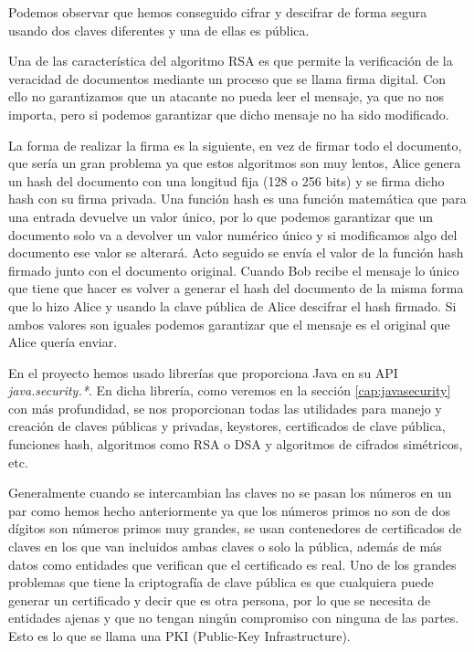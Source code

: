 Podemos observar que hemos conseguido cifrar y descifrar de forma segura usando dos claves diferentes y una de ellas es pública.

Una de las característica del algoritmo RSA es que permite la verificación de la veracidad de documentos mediante un proceso que se llama firma digital. Con ello no garantizamos que un atacante no pueda leer el mensaje, ya que no nos importa, pero si podemos garantizar que dicho mensaje no ha sido modificado. 

La forma de realizar la firma es la siguiente, en vez de firmar todo el documento, que sería un gran problema ya que estos algoritmos son muy lentos, Alice genera un hash del documento con una longitud fija (128 o 256 bits) y se firma dicho hash con su firma privada. Una función hash es una función matemática que para una entrada devuelve un valor único, por lo que podemos garantizar que un documento solo va a devolver un valor numérico único y si modificamos algo del documento ese valor se alterará. Acto seguido se envía el valor de la función hash firmado junto con el documento original. Cuando Bob recibe el mensaje lo único que tiene que hacer es volver a generar el hash del documento de la misma forma que lo hizo Alice y usando la clave pública de Alice descifrar el hash firmado. Si ambos valores son iguales podemos garantizar que el mensaje es el original que Alice quería enviar.

En el proyecto hemos usado librerías que proporciona Java en su API \textit{java.security.*}. En dicha librería, como veremos en la sección \ref{cap:javasecurity} con más profundidad, se nos proporcionan todas las utilidades para manejo y creación de claves públicas y privadas, keystores, certificados de clave pública, funciones hash, algoritmos como RSA o DSA y algoritmos de cifrados simétricos, etc. 

Generalmente cuando se intercambian las claves no se pasan los números en un par como hemos hecho anteriormente ya que los números primos no son de dos dígitos son números primos muy grandes, se usan contenedores de certificados de claves en los que van incluidos ambas claves o solo la pública, además de más datos como entidades que verifican que el certificado es real. Uno de los grandes problemas que tiene la criptografía de clave pública es que cualquiera puede generar un certificado y decir que es otra persona, por lo que se necesita de entidades ajenas y que no tengan ningún compromiso con ninguna de las partes. Esto es lo que se llama una PKI (Public-Key Infrastructure).

